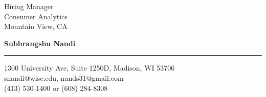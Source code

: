 \documentclass{letter} %
\begin{document}
\signature{Subhrangshu Nandi}           %
\longindentation=0pt                       %
\let\raggedleft\raggedright                %
 
 
\begin{letter}
{Hiring Manager \\
Consumer Analytics \\
Mountain View, CA
}




\begin{flushleft}
{\bf Subhrangshu Nandi}
\end{flushleft}
\medskip\hrule height 1pt
\begin{flushright}
\hfill 1300 University Ave, Suite 1250D, Madison, WI 53706 \\
\hfill snandi@wisc.edu, nands31@gmail.com\\
\hfill (413) 530-1400 or (608) 284-8308
\end{flushright} 
\vfill %


\end{letter}
\end{document}
